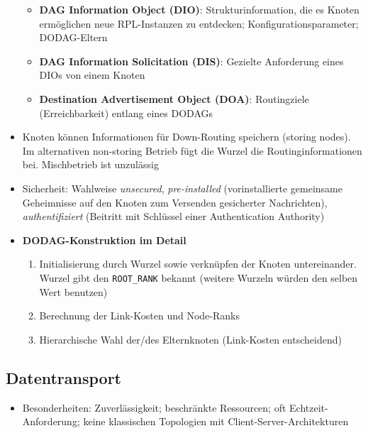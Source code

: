 \begin{itemize}
\begin{itemize}
		\item \textbf{DAG Information Object (DIO)}: Strukturinformation, die es Knoten ermöglichen neue RPL-Instanzen zu entdecken; Konfigurationsparameter; DODAG-Eltern
		\item \textbf{DAG Information Solicitation (DIS)}: Gezielte Anforderung eines DIOs von einem Knoten
		\item \textbf{Destination Advertisement Object (DOA)}: Routingziele (Erreichbarkeit) entlang eines DODAGs
	\end{itemize}
	\item Knoten können Informationen für Down-Routing speichern (storing nodes). Im alternativen non-storing Betrieb fügt die Wurzel die Routinginformationen bei. Mischbetrieb ist unzulässig
	\item Sicherheit: Wahlweise \textit{unsecured}, \textit{pre-installed} (vorinstallierte gemeinsame Geheimnisse auf den Knoten zum Versenden gesicherter Nachrichten), \textit{authentifiziert} (Beitritt mit Schlüssel einer Authentication Authority)
	\item \textbf{DODAG-Konstruktion im Detail}
	\begin{enumerate}
		\item Initialisierung durch Wurzel sowie verknüpfen der Knoten untereinander. Wurzel gibt den \texttt{ROOT\_RANK} bekannt (weitere Wurzeln würden den selben Wert benutzen)
		\item Berechnung der Link-Kosten und Node-Ranks
		\item Hierarchische Wahl der/des Elternknoten (Link-Kosten entscheidend)
	\end{enumerate}
\end{itemize}


\subsection{Datentransport}
\begin{itemize}
	\item Besonderheiten: Zuverlässigkeit; beschränkte Ressourcen; oft Echtzeit-Anforderung; keine klassischen Topologien mit Client-Server-Architekturen
\end{itemize}

